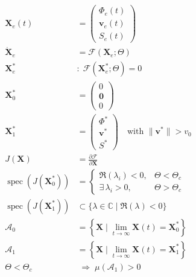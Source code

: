 \documentclass[11pt,oneside]{article}
\begin{document}
\begin{align}
\mathbf{X}_e(t)
&=
\begin{pmatrix}
\Phi_e(t) \\
\mathbf{v}_e(t) \\
S_e(t)
\end{pmatrix}
\\[10pt]

\dot{\mathbf{X}}_e
&=
\mathcal{F}\!\left(\mathbf{X}_e; \Theta\right)
\\[12pt]

\mathbf{X}_e^\ast
&:\;
\mathcal{F}\!\left(\mathbf{X}_e^\ast; \Theta\right) = 0
\\[12pt]

\mathbf{X}_0^\ast
&=
\begin{pmatrix}
0 \\
\mathbf{0} \\
0
\end{pmatrix}
\\[12pt]

\mathbf{X}_1^\ast
&=
\begin{pmatrix}
\Phi^\ast \\
\mathbf{v}^\ast \\
S^\ast
\end{pmatrix}
\quad
\text{with }
\|\mathbf{v}^\ast\| > v_0
\\[14pt]

J(\mathbf{X})
&=
\frac{\partial \mathcal{F}}{\partial \mathbf{X}}
\\[10pt]

\operatorname{spec}
\left(
J(\mathbf{X}_0^\ast)
\right)
&=
\begin{cases}
\Re(\lambda_i) < 0, & \Theta < \Theta_c \\[6pt]
\exists\, \lambda_i > 0, & \Theta > \Theta_c
\end{cases}
\\[14pt]

\operatorname{spec}
\left(
J(\mathbf{X}_1^\ast)
\right)
&\subset
\{ \lambda \in \mathbb{C} \mid \Re(\lambda) < 0 \}
\\[14pt]

\mathcal{A}_0
&=
\left\{
\mathbf{X} \mid
\lim_{t \to \infty}
\mathbf{X}(t) = \mathbf{X}_0^\ast
\right\}
\\[12pt]

\mathcal{A}_1
&=
\left\{
\mathbf{X} \mid
\lim_{t \to \infty}
\mathbf{X}(t) = \mathbf{X}_1^\ast
\right\}
\\[14pt]

\Theta < \Theta_c
&\;\Longrightarrow\;
\mu(\mathcal{A}_1) > 0
\\[10pt]


\end{align}
\end{document}
